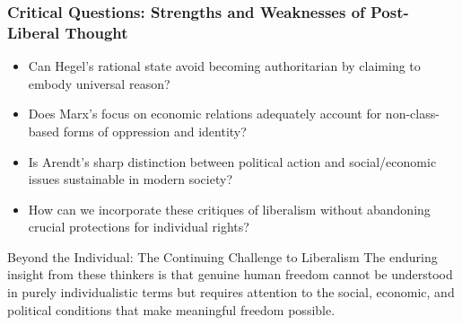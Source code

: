 \documentclass{beamer}
\begin{document}
\begin{frame}
\frametitle{Critical Questions: Strengths and Weaknesses of Post-Liberal Thought}
\begin{itemize}
    \item Can Hegel's rational state avoid becoming authoritarian by claiming to embody universal reason?
    \item Does Marx's focus on economic relations adequately account for non-class-based forms of oppression and identity?
    \item Is Arendt's sharp distinction between political action and social/economic issues sustainable in modern society?
    \item How can we incorporate these critiques of liberalism without abandoning crucial protections for individual rights?
\end{itemize}

\begin{alertblock}{Beyond the Individual: The Continuing Challenge to Liberalism}
The enduring insight from these thinkers is that genuine human freedom cannot be understood in purely individualistic terms but requires attention to the social, economic, and political conditions that make meaningful freedom possible.
\end{alertblock}
\end{frame}
\end{document}
